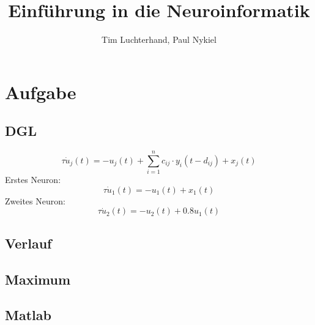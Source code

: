 \documentclass[DIN, pagenumber=false, fontsize=11pt, parskip=half]{scrartcl}
\title{Einführung in die Neuroinformatik}
\author{Tim Luchterhand, Paul Nykiel}
\begin{document}
    \maketitle
    \section{Aufgabe}
    \subsection{DGL}
    \begin{equation*}
        \tau \dot{u}_j(t) = -u_j(t) + \sum_{i=1}^n c_{ij} \cdot y_i(t-d_{ij}) + x_j(t)
    \end{equation*}
    Erstes Neuron:
    \begin{equation*}
        \tau \dot{u}_1(t) = -u_1(t) + x_1(t)
    \end{equation*}
    Zweites Neuron:
    \begin{equation*}
        \tau \dot{u}_2(t) = -u_2(t) + 0.8 u_1(t) 
    \end{equation*}
    \subsection{Verlauf}
    \subsection{Maximum}

    \subsection{Matlab}
    
\end{document}
